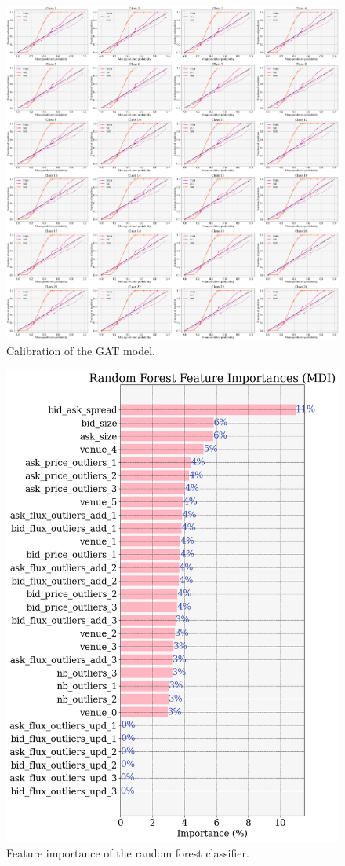 \documentclass[switch, 11pt]{article}
\begin{document}
\begin{figure}[H]
    \centering
    \includegraphics[width=\columnwidth]{figures/calibration.png}
    \caption{Calibration of the GAT model.}
    \label{fig:full_calibration}
\end{figure}

\begin{figure}[H]
    \centering
    \includegraphics[width=0.6\columnwidth]{figures/feature_importance.png}
    \caption{Feature importance of the random forest classifier.}
    \label{fig:feature_importance}
\end{figure}
\end{document}
